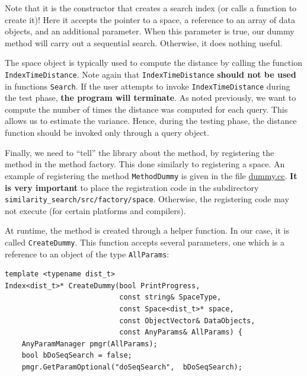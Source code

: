 \documentclass[runningheads,a4paper]{llncs}
\newcommand{\ttt}[1]{\texttt{#1}}
\begin{document}
{Note that it is the constructor that creates a search index (or calls a function to create it)!
Here it accepts the pointer to a space,
a reference to an array of data objects, 
and an additional parameter.
When this parameter is true, our dummy method will carry out a sequential search.
Otherwise, it does nothing useful.

The space object is typically used to compute the distance by calling
the function \ttt{IndexTimeDistance}.
Note again that \ttt{IndexTimeDistance} \textbf{should not be used} in functions
\ttt{Search}. 
If the user attempts to invoke \ttt{IndexTimeDistance} during the test phase,
\textbf{the program will terminate}.
As noted previously, we want to compute the number of times
the distance was computed for each query. This allows us to estimate the variance.
Hence, during the testing phase, the distance function should be invoked only through
a query object.


Finally, we need to ``tell'' the library about the method,
by registering the method in the method factory.
This done similarly to registering a space.
An example of registering the method \ttt{MethodDummy}
is given in the file \href{https://github.com/searchivarius/NonMetricSpaceLib/blob/master/similarity_search/src/factory/method/dummy.cc}{dummy.cc}.
\textbf{It is very important} to place the registration code in the subdirectory \newline
\ttt{similarity\_search/src/factory/space}. Otherwise, the registering code may not execute (for certain
platforms and compilers).

\newpage
At runtime, the method is created through a helper function.
In our case, it is called \ttt{CreateDummy}.
This function accepts several parameters,
one which is a reference to an object of the type \ttt{AllParams}:
\begin{verbatim}
template <typename dist_t>
Index<dist_t>* CreateDummy(bool PrintProgress,
                           const string& SpaceType,
                           const Space<dist_t>* space,
                           const ObjectVector& DataObjects,
                           const AnyParams& AllParams) {
    AnyParamManager pmgr(AllParams);
    bool bDoSeqSearch = false;
    pmgr.GetParamOptional("doSeqSearch",  bDoSeqSearch);


\end{verbatim}}
\end{document}
